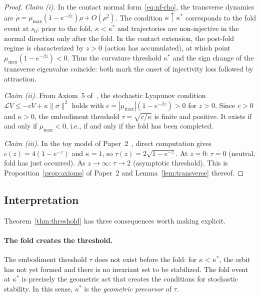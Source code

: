 \begin{proof}
\textit{Claim (i).}
In the contact normal form~\eqref{eq:nf-rho}, the transverse
dynamics are $\dot\rho = \mu_{\max}(1-e^{-\beta z})\rho +
O(\rho^2)$. The condition $\kappa\uparrow\kappa^*$ corresponds
to the fold event at $s_0$: prior to the fold, $\kappa<\kappa^*$
and trajectories are non-injective in the normal direction only
after the fold. In the contact extension, the post-fold regime
is characterized by $z>0$ (action has accumulated), at which
point $\mu_{\max}(1-e^{-\beta z})<0$. Thus the curvature
threshold $\kappa^*$ and the sign change of the transverse
eigenvalue coincide: both mark the onset of injectivity loss
followed by attraction.

\textit{Claim (ii).}
From Axiom~5 of~\cite{Paper1}, the stochastic Lyapunov condition
$\mathcal{L}V \le -cV + \kappa\|\sigma\|^2$ holds with
$c = |\mu_{\max}|(1-e^{-\beta z}) > 0$ for $z>0$. Since
$c>0$ and $\kappa>0$, the embodiment threshold
$\tau = \sqrt{c/\kappa}$ is finite and positive. It exists
if and only if $\mu_{\max}<0$, i.e., if and only if the fold
has been completed.

\textit{Claim (iii).}
In the toy model of Paper~2~\cite{Paper2}, direct computation
gives $c(z)=4(1-e^{-z})$ and $\kappa=1$, so
$\tau(z)=2\sqrt{1-e^{-z}}$. At $z=0$: $\tau=0$ (neutral,
fold has just occurred). As $z\to\infty$: $\tau\to 2$
(asymptotic threshold). This is Proposition~\ref{prop:axioms}
of Paper~2 and Lemma~\ref{lem:transverse} thereof.
\end{proof}

\subsection{Interpretation}
\label{subsec:interpretation}

Theorem~\ref{thm:threshold} has three consequences worth
making explicit.

\paragraph{The fold creates the threshold.}
The embodiment threshold $\tau$ does not exist before the fold:
for $\kappa<\kappa^*$, the orbit has not yet formed and there is
no invariant set to be stabilized. The fold event at $\kappa^*$
is precisely the geometric act that creates the conditions for
stochastic stability. In this sense, $\kappa^*$ is the
\emph{geometric precursor} of $\tau$.

